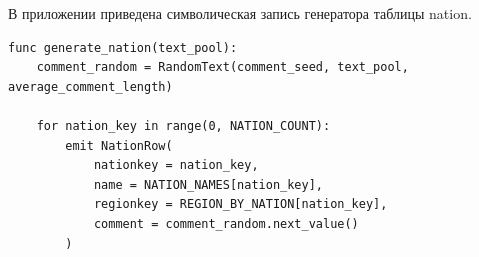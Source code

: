\setcounter{appendixlstbase}{\value{lstlisting}}
\renewcommand{\thelstlisting}{\Asbuk{appendicesnum}.\number\numexpr\value{lstlisting}-\value{appendixlstbase}\relax}
\label{appendix:nation}

В приложении приведена символическая запись генератора таблицы
nation.

\begin{lstlisting}[style=reportpseudocode,caption={Формирование таблицы nation},label={lst:app-nation}]
func generate_nation(text_pool):
    comment_random = RandomText(comment_seed, text_pool, average_comment_length)

    for nation_key in range(0, NATION_COUNT):
        emit NationRow(
            nationkey = nation_key,
            name = NATION_NAMES[nation_key],
            regionkey = REGION_BY_NATION[nation_key],
            comment = comment_random.next_value()
        )
\end{lstlisting}
